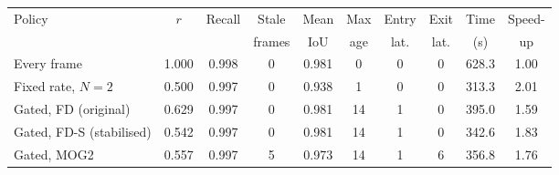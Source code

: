 \begin{tabular}{@{}lccccccccc@{}}
\toprule
Policy & $r$ & Recall & Stale & Mean & Max & Entry & Exit & Time & Speed- \\
 & & & frames & IoU & age & lat. & lat. & (s) & up \\
\midrule
Every frame & 1.000 & 0.998 & 0 & 0.981 & 0 & 0 & 0 & 628.3 & 1.00 \\
Fixed rate, $N=2$ & 0.500 & 0.997 & 0 & 0.938 & 1 & 0 & 0 & 313.3 & 2.01 \\
Gated, FD (original) & 0.629 & 0.997 & 0 & 0.981 & 14 & 1 & 0 & 395.0 & 1.59 \\
Gated, FD-S (stabilised) & 0.542 & 0.997 & 0 & 0.981 & 14 & 1 & 0 & 342.6 & 1.83 \\
Gated, MOG2 & 0.557 & 0.997 & 5 & 0.973 & 14 & 1 & 6 & 356.8 & 1.76 \\
\bottomrule
\end{tabular}
